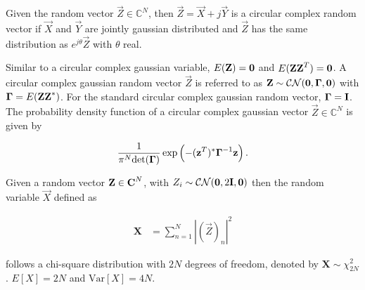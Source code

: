 \documentclass[a4paper, openany, oneside]{memoir}
\begin{document}
\begin{blockDefinition}
Given the random vector $\vec{Z} \in \mathbb{C}^N$, then $\vec{Z} = \vec{X} + j\vec{Y}$ is a circular complex random vector if $\vec{X}$ and $\vec{Y}$ are jointly gaussian distributed and $\vec{Z}$ has the same distribution as $e^{j\theta}\vec{Z}$ with $\theta$ real.
\end{blockDefinition}

Similar to a circular complex gaussian variable, $E(\boldsymbol{\mathbf{Z}}) = \boldsymbol{\mathbf{0}}$
and $E(\boldsymbol{\mathbf{Z}}\boldsymbol{\mathbf{Z}}^T) = \boldsymbol{\mathbf{0}}$\cite{gallager2008circularly}. A circular complex gaussian random vector $\vec{Z}$ is referred to as $\boldsymbol{\mathbf{Z}} \sim \mathcal{CN}(\boldsymbol{\mathbf{0}},\boldsymbol{\mathbf{\Gamma}},\boldsymbol{\mathbf{0}})$ with $\boldsymbol{\mathbf{\Gamma}} = E(\boldsymbol{\mathbf{Z}}\boldsymbol{\mathbf{Z}}^* )$. For the standard circular complex gaussian random vector, $\mathbf{\Gamma} = \boldsymbol{\mathbf{I}}$. The probability density function of a circular complex gaussian vector $\vec{Z}\in \mathbb{C}^N$ is given by

\begin{align*}
    \frac{1}{\pi^N \text{det}(\boldsymbol{\mathbf{\Gamma}})} \exp \left(-(\boldsymbol{\mathbf{z}}^T)^* \boldsymbol{\mathbf{\Gamma}}^{-1}\boldsymbol{\mathbf{z}}\right).
\end{align*}

\begin{blockDefinition}
Given a random vector $\boldsymbol{\mathbf{Z}} \in \boldsymbol{\mathbf{C}}^N$, with $Z_i \sim \mathcal{CN}(\boldsymbol{\mathbf{0}}, 2\boldsymbol{\mathbf{I}},\boldsymbol{\mathbf{0}})$ then the random variable $\vec{X}$ defined as

\begin{align*}
	\mathbf{X} &= \sum_{n=1}^N \left|(\vec{Z})_n\right|^2 %
\end{align*}






follows a chi-square distribution with $2N$ degrees of freedom, denoted by $\mathbf{X} \sim \chi^2_{2N}$.
$E[X] = 2N$ and $\text{Var}[X] = 4N$.
\end{blockDefinition}
\end{document}

